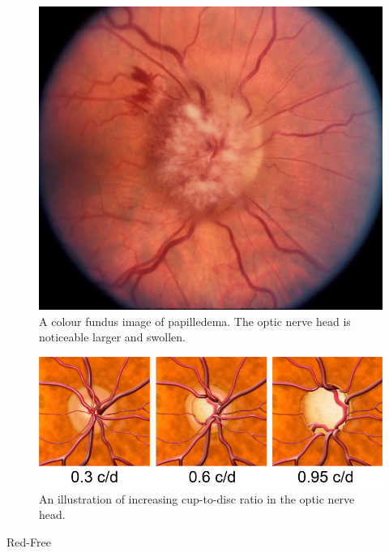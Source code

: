 \begin{figure}[htbp]
\centering
  \includegraphics{figures/papilledema }
\caption{A colour fundus image of papilledema. The optic nerve head is noticeable larger and swollen.}
\label{fig:pap }
     \end{figure}

\begin{figure}[htbp]
\centering
  \includegraphics{figures/opticnervecupping}
\caption{An illustration of increasing cup-to-disc ratio in the optic nerve head.}
\label{fig:cup }
     \end{figure}

	

Red-Free

